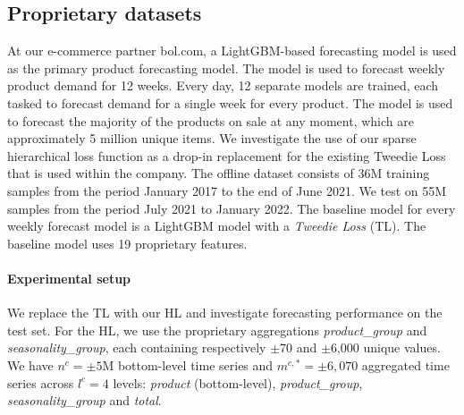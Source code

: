 \documentclass[preprint, 3p, times, twocolumn]{elsarticle}
\begin{document}
  \subsection{Proprietary datasets} \label{subsec:proprietarydatasets}
  At our e-commerce partner bol.com, a LightGBM-based forecasting model is used as the primary product forecasting model. The model is used to forecast weekly product demand for 12 weeks. Every day, 12 separate models are trained, each tasked to forecast demand for a single week for every product. The model is used to forecast the majority of the products on sale at any moment, which are approximately 5 million unique items. We investigate the use of our sparse hierarchical loss function as a drop-in replacement for the existing Tweedie Loss that is used within the company. The offline dataset consists of 36M training samples from the period January 2017 to the end of June 2021. We test on 55M samples from the period July 2021 to January 2022. The baseline model for every weekly forecast model is a LightGBM model with a \textit{Tweedie Loss} (TL). The baseline model uses 19 proprietary features. 
  
  \paragraph{Experimental setup} We replace the TL with our HL and investigate forecasting performance on the test set. For the HL, we use the proprietary aggregations \textit{product\_group} and \textit{seasonality\_group}, each containing respectively $\pm$70 and $\pm$6,000 unique values. We have \(n^c = \pm5\)M bottom-level time series and \(m^{c,*} = \pm6,070\) aggregated time series across \(l^c = 4\) levels: \textit{product} (bottom-level), \textit{product\_group}, \textit{seasonality\_group} and \textit{total}.
\end{document}
